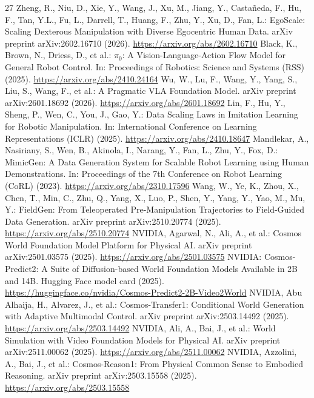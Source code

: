 \documentclass[runningheads]{llncs}
\begin{document}
\begin{thebibliography}{27}
 Zheng, R., Niu, D., Xie, Y., Wang, J., Xu, M., Jiang, Y., Casta\~neda, F., Hu, F., Tan, Y.L., Fu, L., Darrell, T., Huang, F., Zhu, Y., Xu, D., Fan, L.: EgoScale: Scaling Dexterous Manipulation with Diverse Egocentric Human Data. arXiv preprint arXiv:2602.16710 (2026). \url{https://arxiv.org/abs/2602.16710}
 Black, K., Brown, N., Driess, D., et al.: $\pi_0$: A Vision-Language-Action Flow Model for General Robot Control. In: Proceedings of Robotics: Science and Systems (RSS) (2025). \url{https://arxiv.org/abs/2410.24164}
 Wu, W., Lu, F., Wang, Y., Yang, S., Liu, S., Wang, F., et al.: A Pragmatic VLA Foundation Model. arXiv preprint arXiv:2601.18692 (2026). \url{https://arxiv.org/abs/2601.18692}
 Lin, F., Hu, Y., Sheng, P., Wen, C., You, J., Gao, Y.: Data Scaling Laws in Imitation Learning for Robotic Manipulation. In: International Conference on Learning Representations (ICLR) (2025). \url{https://arxiv.org/abs/2410.18647}
 Mandlekar, A., Nasiriany, S., Wen, B., Akinola, I., Narang, Y., Fan, L., Zhu, Y., Fox, D.: MimicGen: A Data Generation System for Scalable Robot Learning using Human Demonstrations. In: Proceedings of the 7th Conference on Robot Learning (CoRL) (2023). \url{https://arxiv.org/abs/2310.17596}
 Wang, W., Ye, K., Zhou, X., Chen, T., Min, C., Zhu, Q., Yang, X., Luo, P., Shen, Y., Yang, Y., Yao, M., Mu, Y.: FieldGen: From Teleoperated Pre-Manipulation Trajectories to Field-Guided Data Generation. arXiv preprint arXiv:2510.20774 (2025). \url{https://arxiv.org/abs/2510.20774}
 NVIDIA, Agarwal, N., Ali, A., et al.: Cosmos World Foundation Model Platform for Physical AI. arXiv preprint arXiv:2501.03575 (2025). \url{https://arxiv.org/abs/2501.03575}
 NVIDIA: Cosmos-Predict2: A Suite of Diffusion-based World Foundation Models Available in 2B and 14B. Hugging Face model card (2025). \url{https://huggingface.co/nvidia/Cosmos-Predict2-2B-Video2World}
 NVIDIA, Abu Alhaija, H., Alvarez, J., et al.: Cosmos-Transfer1: Conditional World Generation with Adaptive Multimodal Control. arXiv preprint arXiv:2503.14492 (2025). \url{https://arxiv.org/abs/2503.14492}
 NVIDIA, Ali, A., Bai, J., et al.: World Simulation with Video Foundation Models for Physical AI. arXiv preprint arXiv:2511.00062 (2025). \url{https://arxiv.org/abs/2511.00062}
 NVIDIA, Azzolini, A., Bai, J., et al.: Cosmos-Reason1: From Physical Common Sense to Embodied Reasoning. arXiv preprint arXiv:2503.15558 (2025). \url{https://arxiv.org/abs/2503.15558}

\end{thebibliography}
\end{document}
